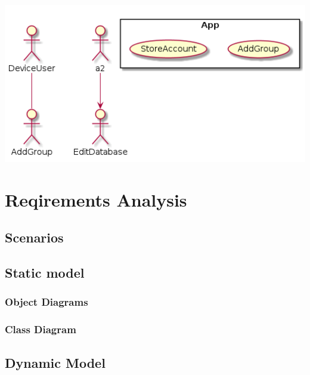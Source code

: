 \documentclass[stu]{apa7}
\begin{document}
{{\includegraphics[scale=0.5]{diag/gt/uc2.png}

\section{Reqirements Analysis}

\subsection{Scenarios}

\subsection{Static model}

\subsubsection{Object Diagrams}

\subsubsection{Class Diagram}

\subsection{Dynamic Model}

%
%
%
%

}}
\end{document}
